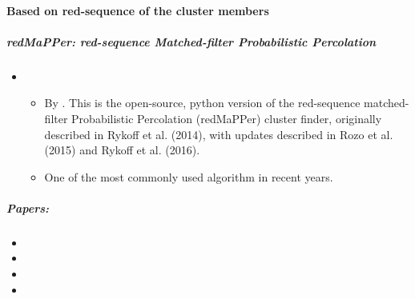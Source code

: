 \documentclass[letterpaper,10pt,english]{sphinxmanual}
\begin{document}
\paragraph{Based on red-sequence of the cluster members}
\label{\detokenize{resource/astro/topics/cluster_finder:based-on-red-sequence-of-the-cluster-members}}

\subparagraph{redMaPPer: red-sequence Matched-filter Probabilistic Percolation}
\label{\detokenize{resource/astro/topics/cluster_finder:redmapper-red-sequence-matched-filter-probabilistic-percolation}}\begin{itemize}
\item {} 
\begin{itemize}
\item {} 
By . This is the
open-source, python version of the red-sequence matched-filter
Probabilistic Percolation (redMaPPer) cluster finder, originally
described in Rykoff et al. (2014), with updates described in Rozo
et al. (2015) and Rykoff et al. (2016).

\item {} 
One of the most commonly used algorithm in recent years.

\end{itemize}

\end{itemize}


\subparagraph{Papers:}
\label{\detokenize{resource/astro/topics/cluster_finder:papers}}\begin{itemize}
\item {} 

\item {} 

\item {} 

\item {} 

\end{itemize}
\end{document}
